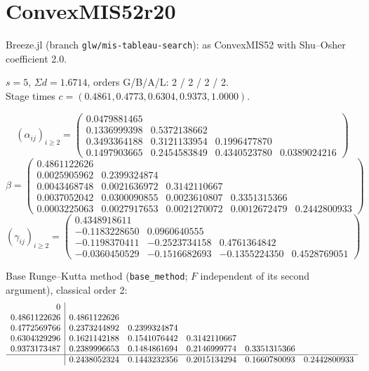 \documentclass[11pt,a4paper]{article}
\begin{document}
\section{ConvexMIS52r20}
Breeze.jl (branch \texttt{glw/mis-tableau-search}): as ConvexMIS52 with Shu--Osher coefficient 2.0.

\noindent $s=5$, $\Sigma d=1.6714$, orders G/B/A/L: 2 / 2 / 2 / 2.\\ Stage times $c=(0.4861, 0.4773, 0.6304, 0.9373, 1.0000)$.

{\footnotesize\[(\alpha_{ij})_{i\ge2}=\left(\begin{array}{rrrr}0.0479881465 &  &  & \\
0.1336999398 & 0.5372138662 &  & \\
0.3493364188 & 0.3121133954 & 0.1996477870 & \\
0.1497903665 & 0.2454583849 & 0.4340523780 & 0.0389024216\end{array}\right)\]
\[\beta=\left(\begin{array}{rrrrr}0.4861122626 &  &  &  & \\
0.0025905962 & 0.2399324874 &  &  & \\
0.0043468748 & 0.0021636972 & 0.3142110667 &  & \\
0.0037052042 & 0.0300090855 & 0.0023610807 & 0.3351315366 & \\
0.0003225063 & 0.0027917653 & 0.0021270072 & 0.0012672479 & 0.2442800933\end{array}\right)\]
\[(\gamma_{ij})_{i\ge2}=\left(\begin{array}{rrrr}0.4348918611 &  &  & \\
-0.1183228650 & 0.0960640555 &  & \\
-0.1198370411 & -0.2523734158 & 0.4761364842 & \\
-0.0360450529 & -0.1516682693 & -0.1355224350 & 0.4528769051\end{array}\right)\]}

\noindent Base Runge--Kutta method (\texttt{base\_method}; $F$ independent of its second argument), classical order 2:
{\footnotesize\[\begin{array}{r|rrrrr}0 &  &  &  &  & \\
0.4861122626 & 0.4861122626 &  &  &  & \\
0.4772569766 & 0.2373244892 & 0.2399324874 &  &  & \\
0.6304329296 & 0.1621142188 & 0.1541076442 & 0.3142110667 &  & \\
0.9373173487 & 0.2389996653 & 0.1484861694 & 0.2146999774 & 0.3351315366 & \\\hline
 & 0.2438052324 & 0.1443232356 & 0.2015134294 & 0.1660780093 & 0.2442800933\end{array}\]}
\end{document}
